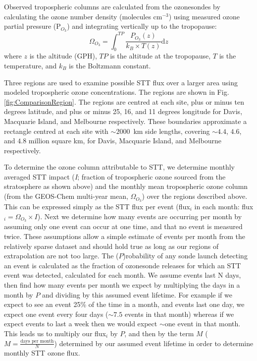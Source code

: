 \documentclass[acp, manuscript]{copernicus} %
\begin{document}
    Observed tropospheric columns are calculated from the ozonesondes by calculating the ozone number density (molecules cm$^{-3}$) using measured ozone partial pressure (P$_{O_3}$) and integrating vertically up to the tropopause:
    \begin{equation*} \Omega_{O_3} = \int_{0}^{TP} \frac{P_{O_3}(z)}{k_B \times T(z)} \mathrm{d}z \end{equation*}
    where $z$ is the altitude (GPH), $TP$ is the altitude at the tropopause, $T$ is the temperature, and $k_B$ is the Boltzmann constant.
    
    Three regions are used to examine possible STT flux over a larger area using modeled tropospheric ozone concentrations.
    The regions are shown in Fig. \ref{fig:ComparisonRegion}.
    The regions are centred at each site, plus or minus ten degrees latitude, and plus or minus 25, 16, and 11 degrees longitude for Davis, Macquarie Island, and Melbourne respectively.
    These boundaries approximate a rectangle centred at each site with $\sim 2000$~km side lengths, covering $\sim 4.4$, $4.6$, and $4.8$ million square km, for Davis, Macquarie Island, and Melbourne respectively.
    
    To determine the ozone column attributable to STT, we determine monthly averaged STT impact (\textit{I}; fraction of tropospheric ozone sourced from the stratosphere as shown above) and the monthly mean tropospheric ozone column (from the GEOS-Chem multi-year mean, $\Omega_{O_3}$) over the regions described above.
    This can be expressed simply as the STT flux per event (flux$_i$ in each month: flux$_i = \Omega_{O_3} \times I$).
    Next we determine how many events are occurring per month by assuming only one event can occur at one time, and that no event is measured twice.
    These assumptions allow a simple estimate of events per month from the relatively sparse dataset and should hold true as long as our regions of extrapolation are not too large.
    The ($P$)robability of any sonde launch detecting an event is calculated as the fraction of ozonesonde releases for which an STT event was detected, calculated for each month.
    We assume events last N days, then find how many events per month we expect by multiplying the days in a month by $P$ and dividing by this assumed event lifetime.
    For example if we expect to see an event 25\% of the time in a month, and events last one day, we expect one event every four days ($\sim 7.5$ events in that month) whereas if we expect events to last a week then we would expect $\sim$one event in that month.
    This leads us to multiply our flux$_i$ by $P$, and then by the term $M$ ($M= \frac{\text{days per month}}{N}$) determined by our assumed event lifetime in order to determine monthly STT ozone flux.
    
\end{document}
